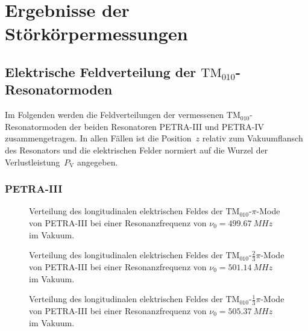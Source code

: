 \chapter{Ergebnisse der Störkörpermessungen}
\label{sec:appendix_felder}

\section{Elektrische Feldverteilung der $\mathrm{TM}_{010}$-Resonatormoden}
\label{app:tm010_felder}
Im Folgenden werden die Feldverteilungen der vermessenen $\mathrm{TM}_{010}$-Resonatormoden der beiden Resonatoren PETRA-III und PETRA-IV zusammengetragen.
In allen Fällen ist die Position~$z$ relativ zum Vakuumflansch des Resonators und die elektrischen Felder normiert auf die Wurzel der Verlustleistung~$P_\mathrm{V}$ angegeben.

\subsection{PETRA-III}
\FloatBarrier
\begin{figure}[h]
  \centering
  
  \caption[Feldverteilung der $\mathrm{TM}_{010}\text{-}\pi$-Mode von PETRA-III]{Verteilung des longitudinalen elektrischen Feldes der $\mathrm{TM}_{010}\text{-}\pi$-Mode von PETRA-III bei einer Resonanzfrequenz von \mbox{$\nu_0 = \SI{499.67}{MHz}$} im Vakuum.}
\end{figure}

\begin{figure}[p]
	\centering
	
	
	\caption[Feldverteilung der $\mathrm{TM}_{010}\text{-}\frac{2}{3}\pi$-Mode von PETRA-III]{Verteilung des longitudinalen elektrischen Feldes der $\mathrm{TM}_{010}\text{-}\frac{2}{3}\pi$-Mode von PETRA-III bei einer Resonanzfrequenz von \mbox{$\nu_0 = \SI{501.14}{MHz}$} im Vakuum.}
	
	
	\caption[Feldverteilung der $\mathrm{TM}_{010}\text{-}\frac{1}{3}\pi$-Mode von PETRA-III]{Verteilung des longitudinalen elektrischen Feldes der $\mathrm{TM}_{010}\text{-}\frac{1}{3}\pi$-Mode von PETRA-III bei einer Resonanzfrequenz von \mbox{$\nu_0 = \SI{505.37}{MHz}$} im Vakuum.}
\end{figure}

